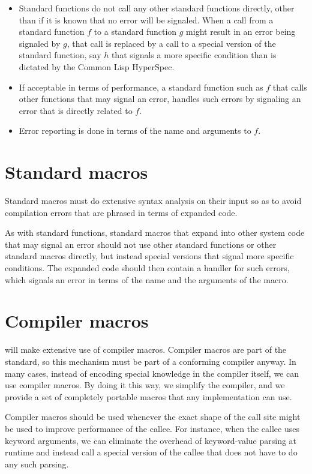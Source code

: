 \begin{itemize}
\item Standard functions do not call any other standard functions
  directly, other than if it is known that no error will be signaled.
  When a call from a standard function $f$ to a standard function $g$
  might result in an error being signaled by $g$, that call is
  replaced by a call to a special version of the standard function,
  say $h$ that signals a more specific condition than is dictated by
  the Common Lisp HyperSpec.
\item If acceptable in terms of performance, a standard function such
  as $f$ that calls other functions that may signal an error, handles
  such errors by signaling an error that is directly related to $f$. 
\item Error reporting is done in terms of the name and arguments to
  $f$. 
  
\end{itemize}

\section{Standard macros}

Standard macros must do extensive syntax analysis on their input so as
to avoid compilation errors that are phrased in terms of expanded
code.  

As with standard functions, standard macros that expand into other
system code that may signal an error should not use other standard
functions or other standard macros directly, but instead special
versions that signal more specific conditions.  The expanded code
should then contain a handler for such errors, which signals an error
in terms of the name and the arguments of the macro. 

\section{Compiler macros}

{\sysname} will make extensive use of compiler macros.  Compiler
macros are part of the standard, so this mechanism must be part of a
conforming compiler anyway.  In many cases, instead of encoding
special knowledge in the compiler itself, we can use compiler macros.
By doing it this way, we simplify the compiler, and we provide a set
of completely portable macros that any implementation can use. 

Compiler macros should be used whenever the exact shape of the call
site might be used to improve performance of the callee.  For
instance, when the callee uses keyword arguments, we can eliminate the
overhead of keyword-value parsing at runtime and instead call a
special version of the callee that does not have to do any such
parsing.  

